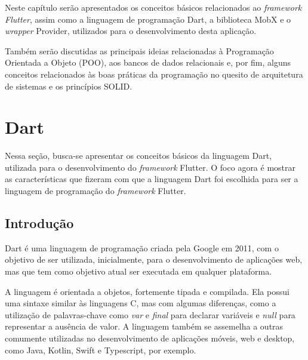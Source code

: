 
\label{Cap:Teoria}

Neste capítulo serão apresentados os conceitos básicos relacionados ao \textit{framework Flutter}, assim como a linguagem de programação Dart, a biblioteca MobX e o \textit{wrapper} Provider, utilizados para o desenvolvimento desta aplicação.

Também serão discutidas as principais ideias relacionadas à Programação Orientada a Objeto (POO), aos bancos de dados relacionais e, por fim, alguns conceitos relacionados às boas práticas da programação no quesito de arquitetura de sistemas e os princípios SOLID.

\section{Dart}
\label{Sec:Dart}

Nessa seção, busca-se apresentar os conceitos básicos da linguagem Dart, utilizada para o desenvolvimento do \textit{framework} Flutter. O foco agora é mostrar as características que fizeram com que a linguagem Dart foi escolhida para ser a linguagem de programação do \textit{framework} Flutter.

\subsection{Introdução}
\label{SubSec: Introducao}

Dart é uma linguagem de programação criada pela Google em 2011, com o objetivo de ser utilizada, inicialmente, para o desenvolvimento de aplicações web, mas que tem como objetivo atual ser executada em qualquer plataforma.

A linguagem é orientada a objetos, fortemente tipada e compilada. Ela possui uma sintaxe similar às linguagens C, mas com algumas diferenças, como a utilização de palavras-chave como \textit{var} e \textit{final} para declarar variáveis e \textit{null} para representar a ausência de valor. A linguagem também se assemelha a outras comumente utilizadas no desenvolvimento de aplicações móveis, web e desktop, como Java, Kotlin, Swift e Typescript, por exemplo.


